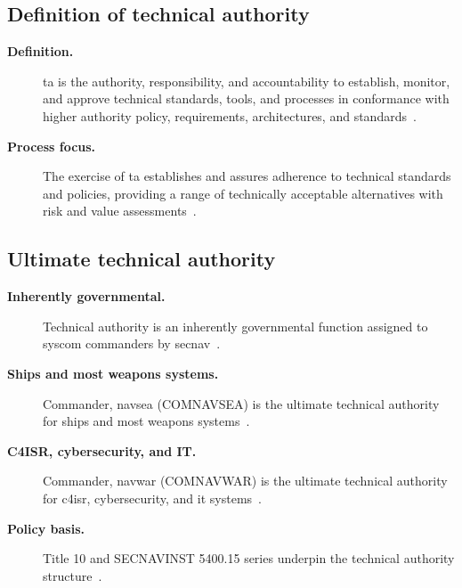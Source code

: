\documentclass[../main.tex]{subfiles}
\begin{document}
\subsection{Definition of technical authority}
\begin{description}
  \item[\textbf{Definition.}] \ac{ta} is the authority, responsibility, and accountability to establish, monitor, and approve technical standards, tools, and processes in conformance with higher authority policy, requirements, architectures, and standards~\autocite{edo-2-1-5-technical-authority-2025}.
  \item[\textbf{Process focus.}] The exercise of \ac{ta} establishes and assures adherence to technical standards and policies, providing a range of technically acceptable alternatives with risk and value assessments~\autocite{edo-2-1-5-technical-authority-2025}.
\end{description}

\subsection{Ultimate technical authority}
\begin{description}
  \item[\textbf{Inherently governmental.}] Technical authority is an inherently governmental function assigned to \ac{syscom} commanders by \ac{secnav}~\autocite{SECNAV5400-15D,edo-2-1-5-technical-authority-2025}.
  \item[\textbf{Ships and most weapons systems.}] Commander, \ac{navsea} (COMNAVSEA) is the ultimate technical authority for ships and most weapons systems~\autocite{edo-2-1-5-technical-authority-2025}.
  \item[\textbf{C4ISR, cybersecurity, and IT.}] Commander, \ac{navwar} (COMNAVWAR) is the ultimate technical authority for \ac{c4isr}, cybersecurity, and \ac{it} systems~\autocite{edo-2-1-5-technical-authority-2025}.
  \item[\textbf{Policy basis.}] Title 10 and SECNAVINST 5400.15 series underpin the technical authority structure~\autocite{USC-10-8669b,SECNAV5400-15D,edo-2-1-5-technical-authority-2025}.
\end{description}
\end{document}
